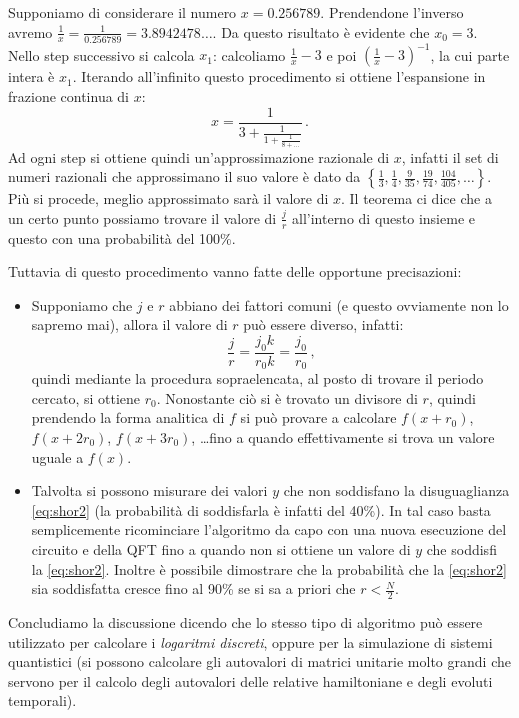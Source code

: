 \begin{esempio}
    Supponiamo di considerare il numero $x=0.256789$. Prendendone l'inverso avremo $\frac{1}{x} = \frac{1}{0.256789} = 3.8942478 \ldots$. Da questo risultato è evidente che $x_0 = 3$. Nello step successivo si calcola $x_1$: calcoliamo $\frac{1}{x}-3$ e poi $\left( \frac{1}{x}-3 \right)^{-1}$, la cui parte intera è $x_1$. Iterando all'infinito questo procedimento si ottiene l'espansione in frazione continua di $x$:
    \begin{equation*}
        x=\frac{1}{3+\frac{1}{1+\frac{1}{8+\dots}}} \, .
    \end{equation*}
    Ad ogni step si ottiene quindi un'approssimazione razionale di $x$, infatti il set di numeri razionali che approssimano il suo valore è dato da $\left\{ \frac 13, \frac 14, \frac 9{35}, \frac {19}{74}, \frac{104}{405}, \dots \right\}$. Più si procede, meglio approssimato sarà il valore di $x$. Il teorema ci dice che a un certo punto possiamo trovare il valore di $\frac jr$ all'interno di questo insieme e questo con una probabilità del 100\%. 
\end{esempio}

\noindent Tuttavia di questo procedimento vanno fatte delle opportune precisazioni:
\begin{itemize}
    \item Supponiamo che $j$ e $r$ abbiano dei fattori comuni (e questo ovviamente non lo sapremo mai), allora il valore di $r$ può essere diverso, infatti:
    \begin{equation*}
        \frac jr=\frac{j_0k}{r_0k}=\frac{j_0}{r_0} \, ,
    \end{equation*}
    quindi mediante la procedura sopraelencata, al posto di trovare il periodo cercato, si ottiene $r_0$. Nonostante ciò si è trovato un divisore di $r$, quindi prendendo la forma analitica di $f$ si può provare a calcolare $f(x+r_0)$, $f(x + 2 r_0)$, $f(x + 3 r_0)$, \dots fino a quando effettivamente si trova un valore uguale a  $f(x)$.
    
    \item Talvolta si possono misurare dei valori $y$ che non soddisfano la disuguaglianza \eqref{eq:shor2} (la probabilità di soddisfarla è infatti del 40\%). In tal caso basta semplicemente ricominciare l'algoritmo da capo con una nuova esecuzione del circuito e della QFT fino a quando non si ottiene un valore di $y$ che soddisfi la \eqref{eq:shor2}. Inoltre è possibile dimostrare che la probabilità che la \eqref{eq:shor2} sia soddisfatta cresce fino al 90\% se si sa a priori che $r < \frac N2$.
\end{itemize}
Concludiamo la discussione dicendo che lo stesso tipo di algoritmo può essere utilizzato per calcolare i \textit{logaritmi discreti}, oppure per la simulazione di sistemi quantistici (si possono calcolare gli autovalori di matrici unitarie molto grandi che servono per il calcolo degli autovalori delle relative hamiltoniane e degli evoluti temporali).